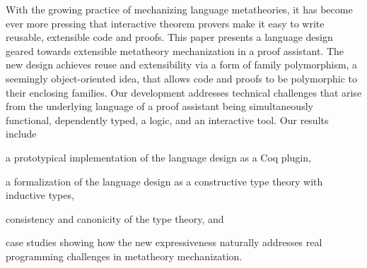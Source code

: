 
With the growing practice of mechanizing language metatheories,
it has become ever more pressing that interactive theorem provers 
make it easy to write reusable, extensible code and proofs.
%
This paper presents a language design geared towards extensible metatheory
mechanization in a proof assistant.
The new design achieves reuse and extensibility via a form of family
polymorphism, a seemingly object-oriented idea, that allows code and
proofs to be polymorphic to their enclosing families.
Our development addresses technical challenges that arise
from the underlying language of a proof assistant being simultaneously
functional, dependently typed, a logic, and an interactive tool.
%
Our results include
\begin{enumerate*}
\item a prototypical implementation of the language design as a Coq plugin,
\item a formalization of the language design as a constructive type theory with inductive types,
\item consistency and canonicity of the type theory,
and 
\item case studies showing how the new expressiveness naturally addresses real
programming challenges in metatheory mechanization.
\end{enumerate*}